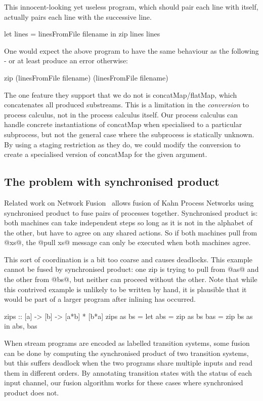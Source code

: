 This innocent-looking yet useless program, which should pair each line with itself, actually pairs each line with the successive line.
\begin{code}
let lines = linesFromFile filename
in  zip lines lines
\end{code}

One would expect the above program to have the same behaviour as the following - or at least produce an error otherwise:
\begin{code}
zip (linesFromFile filename) (linesFromFile filename)
\end{code}

The one feature they support that we do not is concatMap/flatMap, which concatenates all produced substreams.
This is a limitation in the \emph{conversion} to process calculus, not in the process calculus itself.
Our process calculus can handle concrete instantiations of concatMap when specialised to a particular subprocess, but not the general case where the subprocess is statically unknown.
By using a staging restriction as they do, we could modify the conversion to create a specialised version of concatMap for the given argument.


\subsection{The problem with synchronised product}
Related work on Network Fusion~\cite{fradet2004network} allows fusion of Kahn Process Networks using synchronised product to fuse pairs of processes together.
Synchronised product is: both machines can take independent steps so long as it is not in the alphabet of the other, but have to agree on any shared actions.
So if both machines pull from @xs@, the @pull xs@ message can only be executed when both machines agree.

This sort of coordination is a bit too coarse and causes deadlocks.
This example cannot be fused by synchronised product: one zip is trying to pull from @as@ and the other from @bs@, but neither can proceed without the other.
Note that while this contrived example is unlikely to be written by hand, it is plausible that it would be part of a larger program after inlining has occurred.

\begin{code}
zips :: [a] -> [b] -> [a*b] * [b*a]
zips as bs =
  let abs = zip as bs
      bas = zip bs as
  in  abs, bas
\end{code}

When stream programs are encoded as labelled transition systems, some fusion can be done by computing the synchronised product of two transition systems, but this suffers deadlock when the two programs share multiple inputs and read them in different orders.
By annotating transition states with the status of each input channel, our fusion algorithm works for these cases where synchronised product does not.


